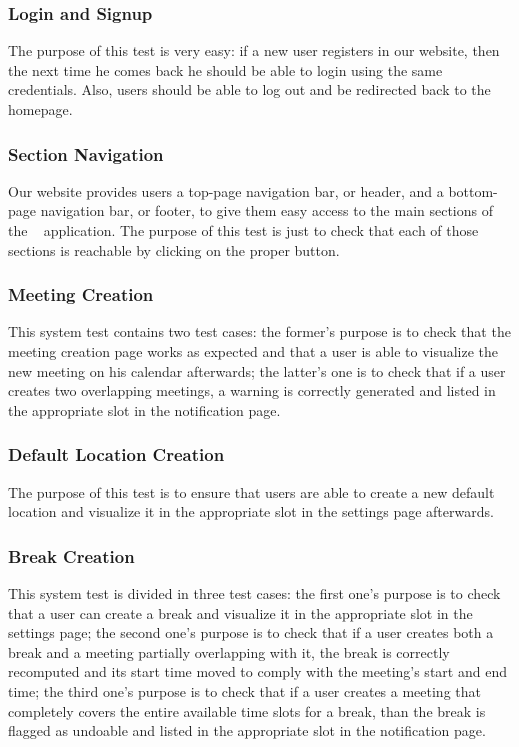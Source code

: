 \subsubsection*{Login and Signup}
The purpose of this test is very easy: if a new user registers in our website, then the next time he comes back he should be able to login using the same credentials. Also, users should be able to log out and be redirected back to the homepage.

\subsubsection*{Section Navigation}
Our website provides users a top-page navigation bar, or header, and a bottom-page navigation bar, or footer, to give them easy access to the main sections of the \projectname~ application. The purpose of this test is just to check that each of those sections is reachable by clicking on the proper button.

\subsubsection*{Meeting Creation}
This system test contains two test cases: the former's purpose is to check that the meeting creation page works as expected and that a user is able to visualize the new meeting on his calendar afterwards; the latter's one is to check that if a user creates two overlapping meetings, a warning is correctly generated and listed in the appropriate slot in the notification page.

\subsubsection*{Default Location Creation}
The purpose of this test is to ensure that users are able to create a new default location and visualize it in the appropriate slot in the settings page afterwards.

\subsubsection*{Break Creation}
This system test is divided in three test cases: the first one's purpose is to check that a user can create a break and visualize it in the appropriate slot in the settings page; the second one's purpose is to check that if a user creates both a break and a meeting partially overlapping with it, the break is correctly recomputed and its start time moved to comply with the meeting's start and end time; the third one's purpose is to check that if a user creates a meeting that completely covers the entire available time slots for a break, than the break is flagged as undoable and listed in the appropriate slot in the notification page.